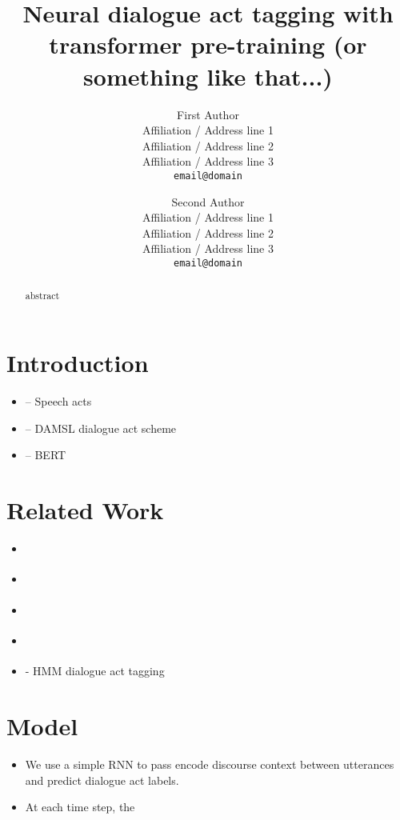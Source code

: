 \documentclass[11pt,a4paper]{article}
\title{Neural dialogue act tagging with transformer pre-training (or something like that...)}
\author{
  First Author \\
  Affiliation / Address line 1 \\
  Affiliation / Address line 2 \\
Affiliation / Address line 3 \\
  {\tt email@domain} \\\and
  Second Author \\
  Affiliation / Address line 1 \\
  Affiliation / Address line 2 \\
  Affiliation / Address line 3 \\
  {\tt email@domain} \\
}
\date{}
\begin{document}
\maketitle

\begin{abstract}
  abstract
\end{abstract}

\section{Introduction}
\begin{itemize}
  \item \cite{austinHowThingsWords2009} -- Speech acts
  \item \cite{coreCodingDialogsDAMSL1997} -- DAMSL dialogue act scheme
  \item \cite{devlinBERTPretrainingDeep2018} -- BERT
\end{itemize}

\section{Related Work}
\begin{itemize}
  \item \cite{cerisaraEffectsUsingWord2vec2017}
  \item \cite{kalchbrennerRecurrentConvolutionalNeural2013}
  \item \cite{pragstVectorRepresentationUtterances2018}
  \item \cite{sordoniNeuralNetworkApproach2015}
  \item \cite{stolckeDialogueActModeling2000} - HMM dialogue act tagging
\end{itemize}

\section{Model}
\begin{itemize}
  \item We use a simple RNN to pass encode discourse context between utterances and predict dialogue act labels.
  \item At each time step, the 
\end{itemize}
\end{document}

